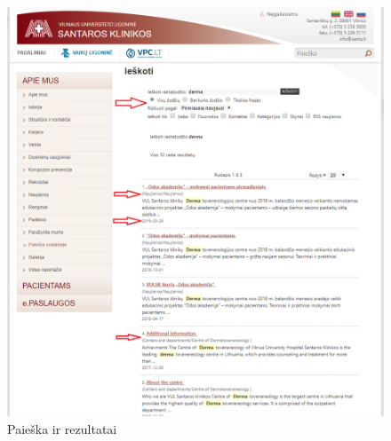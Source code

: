\documentclass{VUMIFPSkursinis}
\begin{document}
\begin{figure}[H]
    \centering
    \includegraphics[scale=0.6]{img/PaieškosRezultatai}
    \caption{Paieška ir rezultatai}
    \label{img:paieškarez}
\end{figure}
\end{document}
